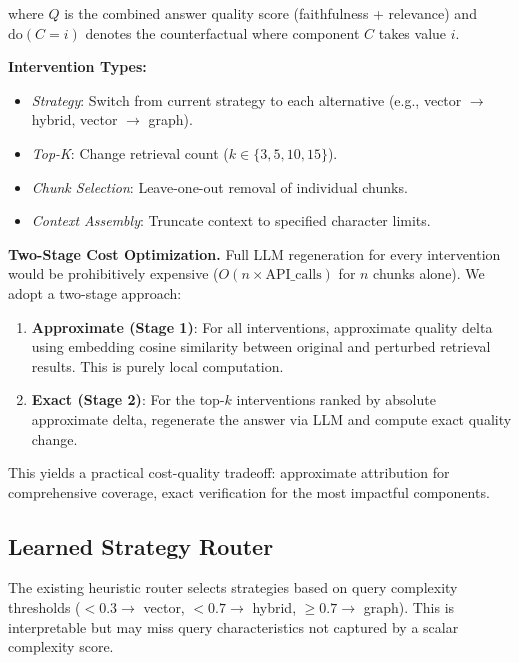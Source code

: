 \documentclass[11pt,a4paper]{article}
\begin{document}
where $Q$ is the combined answer quality score (faithfulness + relevance) and $\text{do}(C=i)$ denotes the counterfactual where component $C$ takes value $i$.

\textbf{Intervention Types:}
\begin{itemize}[leftmargin=*,itemsep=1pt]
\item \textit{Strategy}: Switch from current strategy to each alternative (e.g., vector $\rightarrow$ hybrid, vector $\rightarrow$ graph).
\item \textit{Top-K}: Change retrieval count ($k \in \{3, 5, 10, 15\}$).
\item \textit{Chunk Selection}: Leave-one-out removal of individual chunks.
\item \textit{Context Assembly}: Truncate context to specified character limits.
\end{itemize}

\textbf{Two-Stage Cost Optimization.} Full LLM regeneration for every intervention would be prohibitively expensive ($O(n \times \text{API\_calls})$ for $n$ chunks alone). We adopt a two-stage approach:

\begin{enumerate}[leftmargin=*,itemsep=1pt]
\item \textbf{Approximate (Stage 1)}: For all interventions, approximate quality delta using embedding cosine similarity between original and perturbed retrieval results. This is purely local computation.
\item \textbf{Exact (Stage 2)}: For the top-$k$ interventions ranked by absolute approximate delta, regenerate the answer via LLM and compute exact quality change.
\end{enumerate}

This yields a practical cost-quality tradeoff: approximate attribution for comprehensive coverage, exact verification for the most impactful components.

\subsection{Learned Strategy Router}

The existing heuristic router selects strategies based on query complexity thresholds ($< 0.3 \rightarrow$ vector, $< 0.7 \rightarrow$ hybrid, $\geq 0.7 \rightarrow$ graph). This is interpretable but may miss query characteristics not captured by a scalar complexity score.
\end{document}
